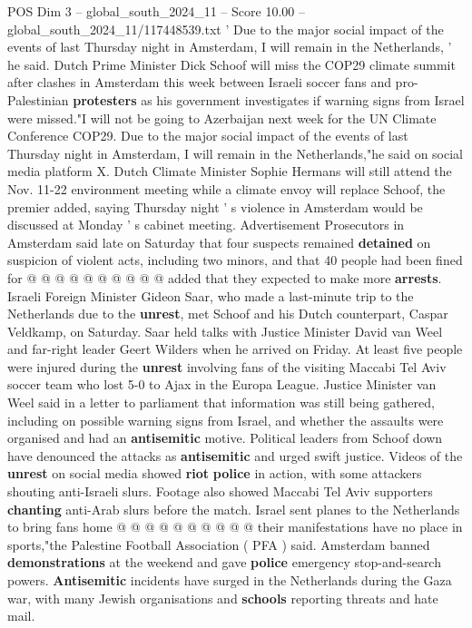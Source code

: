 \begin{textsample}{POS Dim 3 – global\_south\_2024\_11 – Score 10.00 – global\_south\_2024\_11/117448539.txt}  \label{ex:f3_pos_302}
' Due to the major social impact of the events of last Thursday night in Amsterdam, I will remain in the Netherlands, ' he said.
Dutch Prime Minister Dick Schoof will miss the COP29 climate summit after clashes in Amsterdam this week between Israeli soccer fans and pro-Palestinian \textbf{protesters} as his government investigates if warning signs from Israel were missed."I will not be going to Azerbaijan next week for the UN Climate Conference COP29.
Due to the major social impact of the events of last Thursday night in Amsterdam, I will remain in the Netherlands,"he said on social media platform X.
Dutch Climate Minister Sophie Hermans will still attend the Nov. 11-22 environment meeting while a climate envoy will replace Schoof, the premier added, saying Thursday night ' s violence in Amsterdam would be discussed at Monday ' s cabinet meeting.
Advertisement Prosecutors in Amsterdam said late on Saturday that four suspects remained \textbf{detained} on suspicion of violent acts, including two minors, and that 40 people had been fined for @ @ @ @ @ @ @ @ @ @ added that they expected to make more \textbf{arrests}.
Israeli Foreign Minister Gideon Saar, who made a last-minute trip to the Netherlands due to the \textbf{unrest}, met Schoof and his Dutch counterpart, Caspar Veldkamp, on Saturday.
Saar held talks with Justice Minister David van Weel and far-right leader Geert Wilders when he arrived on Friday.
At least five people were injured during the \textbf{unrest} involving fans of the visiting Maccabi Tel Aviv soccer team who lost 5-0 to Ajax in the Europa League.
Justice Minister van Weel said in a letter to parliament that information was still being gathered, including on possible warning signs from Israel, and whether the assaults were organised and had an \textbf{antisemitic} motive.
Political leaders from Schoof down have denounced the attacks as \textbf{antisemitic} and urged swift justice.
Videos of the \textbf{unrest} on social media showed \textbf{riot} \textbf{police} in action, with some attackers shouting anti-Israeli slurs.
Footage also showed Maccabi Tel Aviv supporters \textbf{chanting} anti-Arab slurs before the match.
Israel sent planes to the Netherlands to bring fans home @ @ @ @ @ @ @ @ @ @ their manifestations have no place in sports,"the Palestine Football Association ( PFA ) said.
Amsterdam banned \textbf{demonstrations} at the weekend and gave \textbf{police} emergency stop-and-search powers. \textbf{Antisemitic} incidents have surged in the Netherlands during the Gaza war, with many Jewish organisations and \textbf{schools} reporting threats and hate mail.

\end{textsample}
